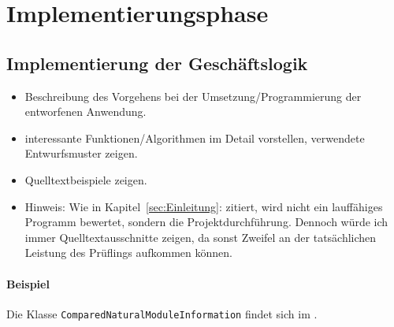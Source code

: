 \section{Implementierungsphase} 
\label{sec:Implementierungsphase}

\subsection{Implementierung der Geschäftslogik}
\label{sec:ImplementierungGeschaeftslogik}

\begin{itemize}
	\item Beschreibung des Vorgehens bei der Umsetzung/Programmierung der entworfenen Anwendung.
	\item \Ggfs interessante Funktionen/Algorithmen im Detail vorstellen, verwendete Entwurfsmuster zeigen.
	\item Quelltextbeispiele zeigen.
	\item Hinweis: Wie in Kapitel~\ref{sec:Einleitung}:  zitiert, wird nicht ein lauffähiges Programm bewertet, sondern die Projektdurchführung. Dennoch würde ich immer Quelltextausschnitte zeigen, da sonst Zweifel an der tatsächlichen Leistung des Prüflings aufkommen können.
\end{itemize}

\paragraph{Beispiel}
Die Klasse \texttt{Com\-par\-ed\-Na\-tu\-ral\-Mo\-dule\-In\-for\-ma\-tion} findet sich im .  









